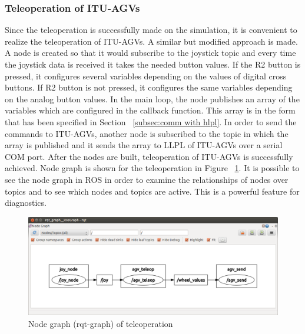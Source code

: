		\subsubsection{Teleoperation of ITU-AGVs}
		\label{subsec:teleop pkg}
		Since the teleoperation is successfully made on the simulation, it is convenient to realize the teleoperation of ITU-AGVs. A similar but modified approach is made. A node is created so that it would subscribe to the joystick topic and every time the joystick data is received it takes the needed button values. If the R2 button is pressed, it configures several variables depending on the values of digital cross buttons. If R2 button is not pressed, it configures the same variables depending on the analog button values. In the main loop, the node publishes an array of the variables which are configured in the callback function. This array is in the form that has been specified in Section ~\ref{subsec:comm with hlpl}. In order to send the commands to ITU-AGVs, another node is subscribed to the topic in which the array is published and it sends the array to LLPL of ITU-AGVs over a serial COM port. After the nodes are built, teleoperation of ITU-AGVs is successfully achieved. Node graph is shown for the teleoperation in Figure ~\ref{fig:teleop-graph}. It is possible to see the node graph in ROS in order to examine the relationships of nodes over topics and to see which nodes and topics are active. This is a powerful feature for diagnostics. 
		\begin{figure}[h]
			\centering
			\includegraphics[scale=0.43]{images/teleop-graph}
			\caption{Node graph (rqt-graph) of teleoperation}
			\label{fig:teleop-graph}
		\end{figure}
